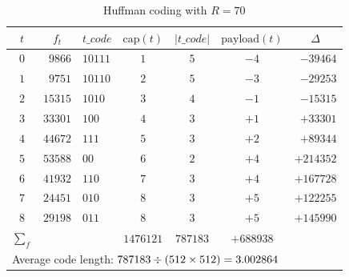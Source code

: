 \documentclass{elsarticle}
\begin{document}
	\begin{table}[!t]
		\centering
		\caption{Huffman coding with \(R = 70\)}
		\label{tab:huffman}
		
		
		\begin{tabular}{c@{\;}rl@{}c@{\;}c@{\;}c@{}r}
			\toprule  
			\(t\) & 
			\multicolumn{1}{c}{\(f_t\)} & 
			\multicolumn{1}{c}{\(t\_code\)} & 
			\(\mathrm{cap}(t)\) & \(\vert t\_code \vert\) & \(\mathrm{payload}(t)\) & 
			\multicolumn{1}{c}{\(\Delta\)} \\
			\midrule  
			$0$ & $9866$  & $10111$ & $1$ & $5$ & $-4$ & $-39464$  \\ 
			$1$ & $9751$  & $10110$ & $2$ & $5$ & $-3$ & $-29253$  \\ 
			$2$ & $15315$ & $1010$  & $3$ & $4$ & $-1$ & $-15315$  \\ 
			$3$ & $33301$ & $100$   & $4$ & $3$ & $+1$ & $+33301$  \\ 
			$4$ & $44672$ & $111$   & $5$ & $3$ & $+2$ & $+89344$  \\ 
			$5$ & $53588$ & $00$    & $6$ & $2$ & $+4$ & $+214352$ \\ 
			$6$ & $41932$ & $110$   & $7$ & $3$ & $+4$ & $+167728$ \\ 
			$7$ & $24451$ & $010$   & $8$ & $3$ & $+5$ & $+122255$ \\ 
			$8$ & $29198$ & $011$   & $8$ & $3$ & $+5$ & $+145990$ \\ 
			\midrule 
			$\sum_f$ &  & & $1476121$ & $787183$ & $+688938$ & \\ 
			\midrule   
			\multicolumn{7}{l}{Average code length: \(787183 \divisionsymbol (512 \times 512) = 3.002864\)} \\
			\bottomrule
		\end{tabular}
		\label{tab:huffman:lena}
		
		

\end{table}
\end{document}
